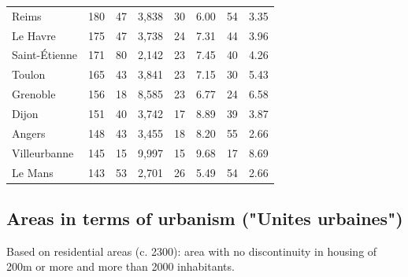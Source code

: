 \documentclass[11pt]{article}
\begin{document}
\begin{table}[H]
\begin{tabular}{llrrrrrr}
         Reims &        180 &         47 &        3,838 &         30 &       6.00 &         54 &        3.35 \\
      Le Havre &        175 &         47 &        3,738 &         24 &       7.31 &         44 &        3.96 \\
 Saint-Étienne &        171 &         80 &        2,142 &         23 &       7.45 &         40 &        4.26 \\
        Toulon &        165 &         43 &        3,841 &         23 &       7.15 &         30 &        5.43 \\
      Grenoble &        156 &         18 &        8,585 &         23 &       6.77 &         24 &        6.58 \\
         Dijon &        151 &         40 &        3,742 &         17 &       8.89 &         39 &        3.87 \\
        Angers &        148 &         43 &        3,455 &         18 &       8.20 &         55 &        2.66 \\
  Villeurbanne &        145 &         15 &        9,997 &         15 &       9.68 &         17 &        8.69 \\
       Le Mans &        143 &         53 &        2,701 &         26 &       5.49 &         54 &        2.66 \\
\bottomrule
\end{tabular}

\end{table}

\subsection{Areas in terms of urbanism ("Unites urbaines")}

Based on residential areas (c. 2300): area with no discontinuity in housing of 200m or more and more than 2000 inhabitants.
\end{document}
